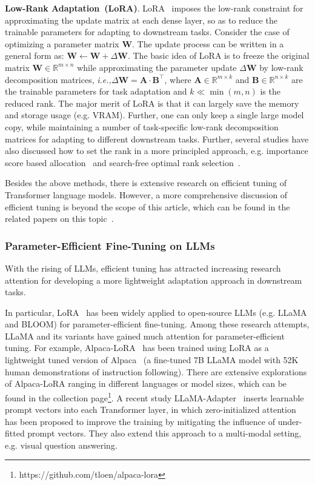 \textbf{Low-Rank Adaptation~(LoRA)}. LoRA~\cite{Hu-ICLR-2022-LoRA} imposes  the low-rank constraint for approximating the update matrix at each dense layer, so as to reduce the trainable parameters  for adapting to downstream tasks. Consider the case of optimizing a parameter matrix $\mathbf{W}$. The update process can be written in a general form as:   $\mathbf{W} \leftarrow \mathbf{W} + \Delta \mathbf{W}$. 
The basic idea of LoRA is to freeze the original matrix $\mathbf{W} \in \mathbb{R}^{m \times n}$ while approximating the parameter update $\Delta \mathbf{W}$ by low-rank decomposition matrices, \emph{i.e.,}$\Delta \mathbf{W}=\mathbf{A}\cdot  \mathbf{B}^\top$, where $\mathbf{A}\in \mathbb{R}^{m \times k}$ and $\mathbf{B}\in \mathbb{R}^{n \times k}$ are the trainable  parameters for task adaptation and $k \ll \min(m,n)$ is the reduced rank. The major merit of LoRA is that it can largely save the memory and storage usage (e.g. VRAM). Further, one can only keep a single large model copy, while maintaining a number of task-specific low-rank decomposition matrices for adapting to different downstream tasks. Further, several studies have also discussed how to set the rank in a more principled approach, e.g. importance score based allocation~\cite{Zhang-arXiv-2023-Adaptive} and search-free optimal rank selection~\cite{Valipour-arXiv-2022-DyLoRA}.

Besides the above  methods, there is  extensive research on efficient tuning of Transformer language models. However, a more comprehensive discussion  of efficient tuning is beyond the scope of this article, which can be found in the related papers on this topic~\cite{He-ICLR-2022-towards,Ding-NMI-2023-Parameter}.  

\subsubsection{Parameter-Efficient Fine-Tuning on LLMs} With the rising of LLMs, efficient tuning  has attracted increasing research attention for developing a more lightweight adaptation approach in downstream tasks. 

In particular, LoRA~\cite{Hu-ICLR-2022-LoRA} has been widely applied to open-source LLMs (e.g. LLaMA and BLOOM) for parameter-efficient fine-tuning. Among these research attempts, LLaMA and its  variants have  gained much attention for parameter-efficient tuning. For example, Alpaca-LoRA~\cite{Alpaca-LoRA} has been trained using LoRA as a lightweight tuned  version of  Alpaca~\cite{Taori-github-2023-Stanford} (a fine-tuned 7B LLaMA model with 52K human demonstrations of instruction following). There are extensive explorations of Alpaca-LoRA ranging in different languages or model sizes, which can be found in the collection page\footnote{https://github.com/tloen/alpaca-lora}. 
 A recent study LLaMA-Adapter~\cite{Zhang-arXiv-2023-LLaMA-Adapter} inserts  learnable prompt vectors into each Transformer layer, in which zero-initialized attention has been proposed to improve the training by mitigating the influence of under-fitted prompt vectors. They  also extend this approach to a multi-modal setting, e.g. visual question answering.   

